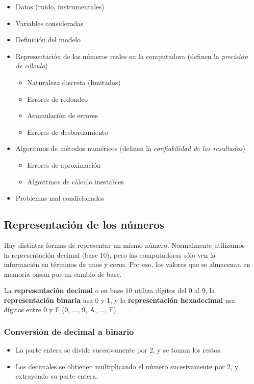 \documentclass{article}
\begin{document}
\begin{itemize}
    \item Datos (ruido, instrumentales)
    \item Variables consideradas
    \item Definición del modelo
    \item Representación de los números reales en la computadora (definen la
        \textit{precisión de cálculo})
    \begin{itemize}
        \item Naturaleza discreta (limitados)
        \item Errores de redondeo
        \item Acumulación de errores
        \item Errores de desbordamiento
    \end{itemize}
    \item Algoritmos de métodos numéricos (definen la
        \textit{confiabilidad de los resultados})
    \begin{itemize}
        \item Errores de aproximación
        \item Algoritmos de cálculo inestables
    \end{itemize}
    \item Problemas mal condicionados
\end{itemize}

\subsection{Representación de los números}

Hay distintas formas de representar un mismo número. Normalmente utilizamos 
la representación decimal (base 10), pero las computadoras sólo ven la
información en términos de unos y ceros. Por eso, los valores que se almacenan
en memoria pasan por un cambio de base.

La \textbf{representación decimal} o en base 10 utiliza dígitos del 0 al 9, la
\textbf{representación binaria} usa 0 y 1, y la 
\textbf{representación hexadecimal} usa dígitos entre 0 y F (0, ..., 9, A, ..., F).

\subsubsection{Conversión de decimal a binario}

\begin{itemize}
    \item La parte entera se divide sucesivamente por 2, y se toman los restos.
    \item Los decimales se obtienen multiplicando el número sucesivamente por 2,
        y extrayendo su parte entera.
\end{itemize}
\end{document}
